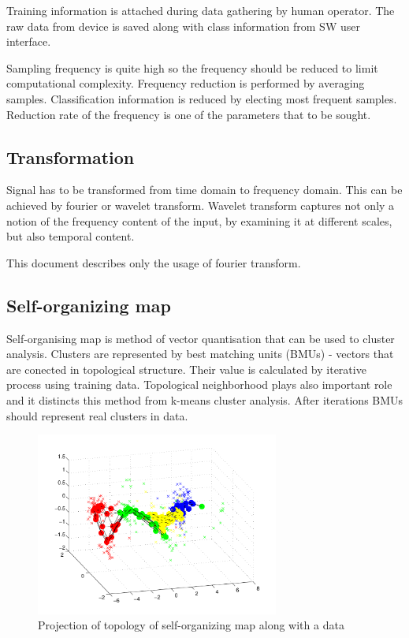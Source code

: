 \documentclass[a4paper,journal]{IEEEtran}
\begin{document}
Training information is attached during data gathering by human operator.
The raw data from device is saved along with class information from
SW user interface.

Sampling frequency is quite high so the frequency should be reduced to limit
computational complexity. Frequency reduction is performed
by averaging samples. Classification information is reduced by electing
most frequent samples. Reduction rate of the frequency is one of the 
parameters that to be sought.

\subsection{Transformation}
Signal has to be transformed from time domain to frequency domain.
This can be achieved by fourier or wavelet transform.
Wavelet transform
captures not only a notion of the frequency content of the input,
by examining it at different scales, but also temporal content.

This document describes only the usage of fourier transform.



\subsection{Self-organizing map}
Self-organising map is method of vector quantisation that can be used to 
cluster analysis. Clusters are represented by best matching units (BMUs)
- vectors that are conected in topological structure. Their value is calculated
by iterative process using training data. Topological neighborhood plays 
also important role and it distincts this method from k-means cluster analysis.
After iterations BMUs should represent real clusters in data.

\begin{figure}[h]
\centering
\includegraphics[width=80mm]{som_topol_proj}
\caption{Projection of topology of self-organizing map along with a data}
\label{som_topol_proj}
\end{figure}
\end{document}
